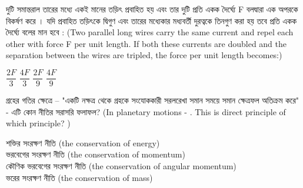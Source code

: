 \documentclass[addpoints]{exam}
\begin{document}
\begin{questions}
\question   দুটি সমান্তরাল তারের মধ্যে একই মানের তড়িৎ প্রবাহিত হয় এবং তার দুটি প্রতি একক দৈর্ঘ্যে F বলদ্বারা এক অপরকে বিকর্ষণ করে । যদি প্রবাহিত তড়িৎকে দ্বিগুণ এবং তারের মধ্যেকার মধ্যবর্তী দুরত্বকে তিনগুণ করা হয় তবে প্রতি একক দৈর্ঘ্যে বলের মান হবে : (Two parallel long wires carry the same current and repel each other with force F per unit length. If both these currents are doubled and the separation between the wires are tripled, the force per unit length becomes:)

\begin{oneparchoices}
\choice $ \dfrac{2F}{3} $
\choice $ \dfrac{4F}{3} $
\choice $ \dfrac{2F}{9} $
\choice $ \dfrac{4F}{9} $

\end{oneparchoices}

\question  গ্রহের গতির ক্ষেত্রে – "একটি নক্ষত্র থেকে গ্রহকে সংযোককারী সরলরেখা সমান সময়ে সমান ক্ষেত্রফল অতিক্রম করে" - এটি কোন নীতির সরাসরি ফলাফল? (In planetary motions - . This is direct principle of which principle? )

\begin{oneparchoices}
\choice শক্তির সংরক্ষণ নীতি (the conservation of energy)\\
\hspace*{-.3cm}\choice ভরবেগের সংরক্ষণ নীতি (the conservation of momentum) \\
\hspace*{-.3cm}\choice কৌণিক ভরবেগের সংরক্ষণ নীতি (the conservation of angular momentum)\\
\hspace*{-.3cm}\choice ভরের সংরক্ষণ নীতি (the conservation of mass)
\end{oneparchoices}

\end{questions}
\end{document}
